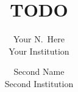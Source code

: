 \documentclass[letterpaper,twocolumn,10pt]{article}
\begin{document}
\date{}

\title{TODO}

\author{{\rm Your N.\ Here}\\
  Your Institution
  \and
  {\rm Second Name}\\
  Second Institution
} %


\maketitle

\thispagestyle{empty}

{}
{}
{}
{}
{}



\end{document}
